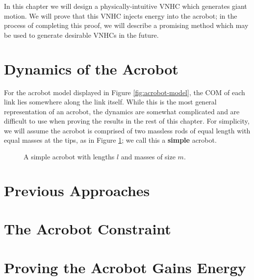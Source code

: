 In this chapter we will design a physically-intuitive VNHC which generates giant
motion. We will prove that this VNHC injects energy into the acrobot;
in the process of completing this proof,
we will describe a promising method which may be used to generate desirable 
VNHCs in the future.

\section{Dynamics of the Acrobot}
For the acrobot model displayed in Figure \ref{fig:acrobot-model}, 
the COM of each link lies somewhere along the link itself. 
While this is the most general representation of an acrobot, the dynamics are
somewhat complicated and are difficult to use when proving the results in the 
rest of this chapter. For simplicity, we will
assume the acrobot is comprised of two massless rods of equal length with 
equal masses at the tips, as in Figure \ref{fig:simple-acrobot-model}; we call
this a \textbf{simple} acrobot.

\begin{figure}
    \centering
    
    \caption{A simple acrobot with lengths \(l\) and masses of size \(m\).}
    \label{fig:simple-acrobot-model}
\end{figure}


\section{Previous Approaches}

\section{The Acrobot Constraint}
\section{Proving the Acrobot Gains Energy}

